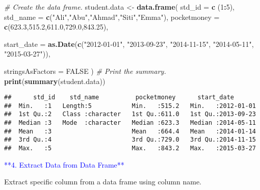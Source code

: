 \documentclass[
]{article}
\newenvironment{Shaded}{\begin{snugshade}}{\end{snugshade}}
\newcommand{\AttributeTok}[1]{\textcolor[rgb]{0.13,0.29,0.53}{#1}}
\newcommand{\CommentTok}[1]{\textcolor[rgb]{0.56,0.35,0.01}{\textit{#1}}}
\newcommand{\ConstantTok}[1]{\textcolor[rgb]{0.56,0.35,0.01}{#1}}
\newcommand{\DecValTok}[1]{\textcolor[rgb]{0.00,0.00,0.81}{#1}}
\newcommand{\FloatTok}[1]{\textcolor[rgb]{0.00,0.00,0.81}{#1}}
\newcommand{\FunctionTok}[1]{\textcolor[rgb]{0.13,0.29,0.53}{\textbf{#1}}}
\newcommand{\NormalTok}[1]{#1}
\newcommand{\OtherTok}[1]{\textcolor[rgb]{0.56,0.35,0.01}{#1}}
\newcommand{\SpecialCharTok}[1]{\textcolor[rgb]{0.81,0.36,0.00}{\textbf{#1}}}
\newcommand{\StringTok}[1]{\textcolor[rgb]{0.31,0.60,0.02}{#1}}
\begin{document}
\begin{Shaded}
\begin{Highlighting}[]
\CommentTok{\# Create the data frame.}
\NormalTok{student.data }\OtherTok{\textless{}{-}} \FunctionTok{data.frame}\NormalTok{(}
   \AttributeTok{std\_id =} \FunctionTok{c}\NormalTok{ (}\DecValTok{1}\SpecialCharTok{:}\DecValTok{5}\NormalTok{), }
   \AttributeTok{std\_name =} \FunctionTok{c}\NormalTok{(}\StringTok{"Ali"}\NormalTok{,}\StringTok{"Abu"}\NormalTok{,}\StringTok{"Ahmad"}\NormalTok{,}\StringTok{"Siti"}\NormalTok{,}\StringTok{"Emma"}\NormalTok{),}
   \AttributeTok{pocketmoney =} \FunctionTok{c}\NormalTok{(}\FloatTok{623.3}\NormalTok{,}\FloatTok{515.2}\NormalTok{,}\FloatTok{611.0}\NormalTok{,}\FloatTok{729.0}\NormalTok{,}\FloatTok{843.25}\NormalTok{), }
   
   \AttributeTok{start\_date =} \FunctionTok{as.Date}\NormalTok{(}\FunctionTok{c}\NormalTok{(}\StringTok{"2012{-}01{-}01"}\NormalTok{, }\StringTok{"2013{-}09{-}23"}\NormalTok{, }\StringTok{"2014{-}11{-}15"}\NormalTok{, }\StringTok{"2014{-}05{-}11"}\NormalTok{,}
      \StringTok{"2015{-}03{-}27"}\NormalTok{)),}
  
   \AttributeTok{stringsAsFactors =} \ConstantTok{FALSE}
\NormalTok{)}
\CommentTok{\# Print the summary.}
\FunctionTok{print}\NormalTok{(}\FunctionTok{summary}\NormalTok{(student.data)) }
\end{Highlighting}
\end{Shaded}

\begin{verbatim}
##      std_id    std_name          pocketmoney      start_date        
##  Min.   :1   Length:5           Min.   :515.2   Min.   :2012-01-01  
##  1st Qu.:2   Class :character   1st Qu.:611.0   1st Qu.:2013-09-23  
##  Median :3   Mode  :character   Median :623.3   Median :2014-05-11  
##  Mean   :3                      Mean   :664.4   Mean   :2014-01-14  
##  3rd Qu.:4                      3rd Qu.:729.0   3rd Qu.:2014-11-15  
##  Max.   :5                      Max.   :843.2   Max.   :2015-03-27
\end{verbatim}

\textcolor{blue}{**4. Extract Data from Data Frame**}

Extract specific column from a data frame using column name.
\end{document}
